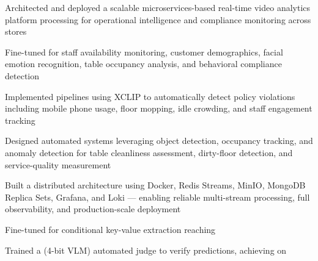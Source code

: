 \documentclass[]{deedy-resume-openfont}
\begin{document}
\begin{minipage}[t]{0.66\textwidth}
\vspace{3.5pt}\noindent{}\par\vspace{1.5pt}
\begin{tightemize}
\item Architected and deployed a scalable microservices-based real-time video analytics platform processing  for operational intelligence and compliance monitoring across stores
\item Fine-tuned  for staff availability monitoring, customer demographics, facial emotion recognition, table occupancy analysis, and behavioral compliance detection
\item Implemented  pipelines using XCLIP to automatically detect policy violations including mobile phone usage, floor mopping, idle crowding, and staff engagement tracking
\item Designed automated  systems leveraging object detection, occupancy tracking, and anomaly detection for table cleanliness assessment, dirty-floor detection, and service-quality measurement
\item Built a  distributed architecture using Docker, Redis Streams, MinIO, MongoDB Replica Sets, Grafana, and Loki --- enabling reliable multi-stream processing, full observability, and production-scale deployment
\end{tightemize}

\vspace{3.5pt}\noindent{}\par\vspace{1.5pt}
\begin{tightemize}
\item Fine-tuned  for conditional key-value extraction reaching 
\item Trained a  (4-bit VLM) automated judge to verify predictions, achieving  on 
\end{tightemize}


\end{minipage}
\end{document}
